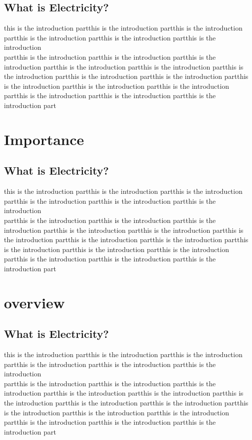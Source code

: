 \documentclass[12pt]{report}
\begin{document}
\section{What is Electricity?}
\lipsum[1-2]
\linebreak
this is the introduction partthis is the introduction partthis is the introduction partthis is the introduction partthis is the introduction partthis is the introduction\\ 
partthis is the introduction partthis is the introduction partthis is the introduction partthis is the introduction partthis is the introduction partthis is the introduction partthis is the introduction partthis is the introduction partthis is the introduction partthis is the introduction partthis is the introduction partthis is the introduction partthis is the introduction partthis is the introduction part

\chapter{Importance}
\section{What is Electricity?}
\lipsum[1-2]
\linebreak
this is the introduction partthis is the introduction partthis is the introduction partthis is the introduction partthis is the introduction partthis is the introduction\\ 
partthis is the introduction partthis is the introduction partthis is the introduction partthis is the introduction partthis is the introduction partthis is the introduction partthis is the introduction partthis is the introduction partthis is the introduction partthis is the introduction partthis is the introduction partthis is the introduction partthis is the introduction partthis is the introduction part\cite{siau2017impact}

\chapter{overview}
\section{What is Electricity?}
\lipsum[1-2]
\linebreak
this is the introduction partthis is the introduction partthis is the introduction partthis is the introduction partthis is the introduction partthis is the introduction\\ 
partthis is the introduction partthis is the introduction partthis is the introduction partthis is the introduction partthis is the introduction partthis is the introduction partthis is the introduction partthis is the introduction partthis is the introduction partthis is the introduction partthis is the introduction partthis is the introduction partthis is the introduction partthis is the introduction part
\cite{brougham2018smart}


\end{document}
